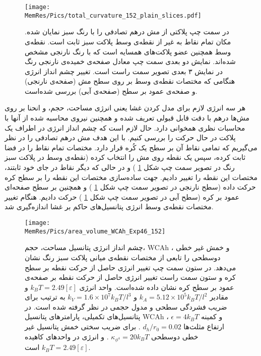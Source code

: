 \begin{figure}[htbp]
\begin{center}
\texttt{[image: \\MemRes/Pics/total\_curvature\_152\_plain\_slices.pdf]}
\caption{
در سمت چپ پلاکتی از مش درهم تصادفی را با رنگ سبز نمایان شده. مکان تمام نقاط به غیر از نقطه‌ی وسط پلاکت سبز ثابت است. نقطه‌ی وسط همچنین عضو پلاکت‌های همسایه‌ است که با رنگ نارنجی مشخص شده‌اند. نمایش دو بعدی سمت چپ معادل صفحه‌ی خمیده‌ی نارنجی رنگ در نمایش ۳ بعدی تصویر سمت راست است. تغییر چشم انداز انرژی هنگامی که مختصات نقطه‌ی وسط بر روی سطح مش (صفحه‌ی نارنجی) و صفحه‌ی عمود بر سطح (صفحه‌ی آبی) بررسی شده‌است.
}
\label{fig:PlacketRepresentaion}
\end{center}
\end{figure}

هر سه انرژی لازم برای مدل کردن غشا یعنی انرژی مساحت، حجم، و انحنا بر روی مش‌ها درهم با دقت قابل قبولی تعریف شده و همچنین نیروی محاسبه شده از آنها با محاسبات نظری همخوانی دارد. حال لازم است که چشم انداز انرژی در اطراف یک پلاکت در حال حرکت را بررسی کنیم. با این هدف مش درهم تصادفی را در نظر می‌گیریم که تمامی نقاط آن بر سطح یک کُره‌ قرار دارد. مختصات تمام نقاط را در فضا ثابت کرده، سپس یک نقطه روی مش را انتخاب کرده (نقطه‌ی وسط در پلاکت سبز رنگ در تصویر سمت چپ شکل
\ref{fig:PlacketRepresentaion}
) و در حالی که دیگر نقاط در جای خود ثابتند، مختصات این نقطه را تغییر دادیم. جهت ساده‌سازی مختصات این نقطه را  بر سطح کره‌ حرکت داده (سطح نارنجی در تصویر سمت چپ شکل
\ref{fig:PlacketRepresentaion}
) و همچنین بر سطح صفحه‌ای عمود بر کره (سطح آبی در تصویر سمت چپ شکل
\ref{fig:PlacketRepresentaion}
) حرکت دادیم. هنگام تغییر مختصات نقطه‌ی وسط انرژی پتانسیل‌های حاکم بر غشا اندازه‌گیری شد. 




\begin{figure}[htbp]
\begin{center}
\texttt{[image: \\MemRes/Pics/area\_volume\_WCAh\_Exp46\_152]}
\caption{
چشم انداز انرژی پتانسیل مساحت، حجم،
WCAh
، و خمش غیر خطی دوسطحی را تابعی از مختصات نقطه‌ی میانی پلاکت سبز رنگ نشان می‌دهد. در ستون سمت چپ تغییر انرژی حاصل از حرکت نقطه بر سطح کره و ستون سمت راست تغییر انرژی حاصل از حرکت نقطه بر صفحه‌ی عمود بر سطح کره  نشان داده شده‌است. واحد انرژی
$k_BT=2.49[\varepsilon]$
 و مقادیر 
 $k_A=5.12\times10^5k_BT/l^2$
 و
 $k_V=1.6\times10^7k_BT/l^3$
 به ترتیب برای ضریب فشردگی سطحی و مدول حجمی در نظر گرفته شده است. در پتانسیل‌های تکمیلی، پارامتر‌های پتانسیل 
 WCAh
 ، 
$\epsilon=4k_BT$
 و کمینه ارتفاع مثلث‌ها 
 $d_h/r_0=0.02$ 
 . برای ضریب سختی خمش پتانسیل غیر خطی دوسطحی 
 $\kappa_{\phi^4}=20k_BT$
 . و انرژی در واحد‌های کاهیده
 $k_BT=2.49[\varepsilon]$
 است.
}
\label{fig:PlacketEnergyArea}
\end{center}
\end{figure}

